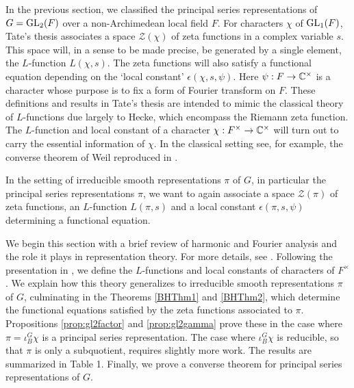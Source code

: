 In the previous section, we classified the principal series representations of $G=\mathrm{GL}_2(F)$ over a non-Archimedean local field $F$. For characters $\chi$ of $\mathrm{GL}_1(F)$, Tate's thesis \cite{Tate} associates a space $\mathcal Z(\chi)$ of zeta functions in a complex variable $s$. This space will, in a sense to be made precise, be generated by a single element, the $L$-function $L(\chi,s)$. The zeta functions will also satisfy a functional equation depending on the `local constant' $\epsilon(\chi,s,\psi)$. Here $\psi :F \to \mathbb{C}^\times$ is a character whose purpose is to fix a form of Fourier transform on $F$. These definitions and results in Tate's thesis are intended to mimic the classical theory of $L$-functions due largely to Hecke, which encompass the Riemann zeta function. The $L$-function and local constant of a character $\chi:F^\times \to \mathbb{C}^\times$ will turn out to carry the essential information of $\chi$. In the classical setting see, for example, the converse theorem of Weil reproduced in \cite[Theorem 1.5.1]{Bump}.

In the setting of irreducible smooth representations $\pi$ of $G$, in particular the principal series representations $\pi$, we want to again associate a space $\mathcal Z(\pi)$ of zeta functions, an $L$-function $L(\pi,s)$ and a local constant $\epsilon(\pi,s,\psi)$ determining a functional equation. 

We begin this section with a brief review of harmonic and Fourier analysis and the role it plays in representation theory. For more details, see \cite[Chapter 3.1]{Bump}. Following the presentation in \cite{GH1}, we define the $L$-functions and local constants of characters of $F^\times$. We explain how this theory generalizes to irreducible smooth representations $\pi$ of $G$, culminating in the Theorems \ref{BHThm1} and \ref{BHThm2}, which determine the functional equations satisfied by the zeta functions associated to $\pi$. Propositions \ref{prop:gl2factor} and \ref{prop:gl2gamma} prove these in the case where $\pi = \iota_B^G \chi$ is a principal series representation. The case where $\iota_B^G \chi$ is reducible, so that $\pi$ is only a subquotient, requires slightly more work. The results are summarized in Table 1. Finally, we prove a converse theorem for principal series representations of $G$.



\newpage